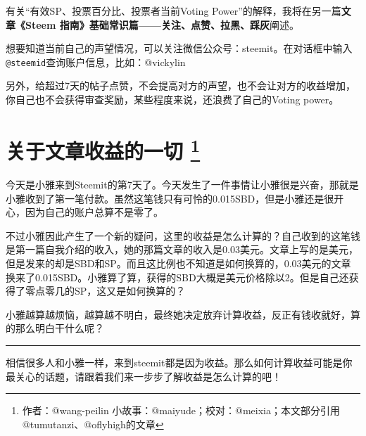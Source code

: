 \documentclass[]{ctexbook}
\begin{document}
有关``有效SP、投票百分比、投票者当前Voting Power''的解释，我将在另一篇\textbf{文章《Steem 指南》基础常识篇------关注、点赞、拉黑、踩灰}阐述。

想要知道当前自己的声望情况，可以关注微信公众号：steemit。在对话框中输入\texttt{@steemid}查询账户信息，比如：@vickylin

另外，给超过7天的帖子点赞，不会提高对方的声望，也不会让对方的收益增加，你自己也不会获得审查奖励，某些程度来说，还浪费了自己的Voting power。

\section[关于文章收益的一切 ]{\texorpdfstring{关于文章收益的一切 \footnote{作者：@wang-peilin 小故事：@maiyude；校对：@meixia；本文部分引用@tumutanzi、@oflyhigh的文章}}{关于文章收益的一切 }}

今天是小雅来到Steemit的第7天了。今天发生了一件事情让小雅很是兴奋，那就是小雅收到了第一笔付款。虽然这笔钱只有可怜的0.015SBD，但是小雅还是很开心，因为自己的账户总算不是零了。

不过小雅因此产生了一个新的疑问，这里的收益是怎么计算的？自己收到的这笔钱是第一篇自我介绍的收入，她的那篇文章的收入是0.03美元。文章上写的是美元，但是发来的却是SBD和SP。而且这比例也不知道是如何换算的，0.03美元的文章换来了0.015SBD。小雅算了算，获得的SBD大概是美元价格除以2。但是自己还获得了零点零几的SP，这又是如何换算的？

小雅越算越烦恼，越算越不明白，最终她决定放弃计算收益，反正有钱收就好，算的那么明白干什么呢？

\begin{center}\rule{0.5\linewidth}{\linethickness}\end{center}

相信很多人和小雅一样，来到steemit都是因为收益。那么如何计算收益可能是你最关心的话题，请跟着我们来一步步了解收益是怎么计算的吧！
\end{document}
